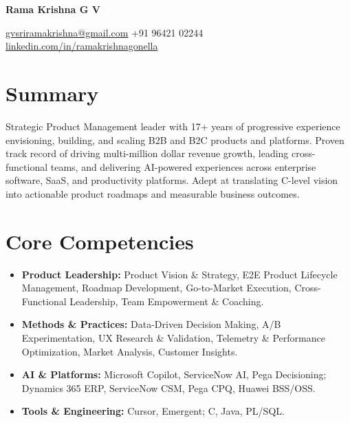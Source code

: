 \documentclass{article}
\newcommand{\resumename}[1]{%
    {\centering\fontsize{22}{26}\selectfont\bfseries #1\par}%
    \vspace{4pt}%
}
\newcommand{\resumecontact}[1]{%
    {\centering\normalsize\color{darkgray}#1\par}%
    \vspace{6pt}%
}
\begin{document}

\resumename{Rama Krishna G V}

\resumecontact{%
    \href{mailto:gvsriramakrishna@gmail.com}{gvsriramakrishna@gmail.com}
    \enspace\textbar\enspace
    +91 96421 02244
    \enspace\textbar\enspace
    \href{https://linkedin.com/in/ramakrishnagonella}{linkedin.com/in/ramakrishnagonella}
}


\section{Summary}

Strategic Product Management leader with 17+ years of progressive experience envisioning, building, and scaling B2B and B2C products and platforms. Proven track record of driving multi-million dollar revenue growth, leading cross-functional teams, and delivering AI-powered experiences across enterprise software, SaaS, and productivity platforms. Adept at translating C-level vision into actionable product roadmaps and measurable business outcomes.

\section{Core Competencies}

\begin{itemize}
    \item \textbf{Product Leadership:} Product Vision \& Strategy, E2E Product Lifecycle Management, Roadmap Development, Go-to-Market Execution, Cross-Functional Leadership, Team Empowerment \& Coaching.
    \item \textbf{Methods \& Practices:} Data-Driven Decision Making, A/B Experimentation, UX Research \& Validation, Telemetry \& Performance Optimization, Market Analysis, Customer Insights.
    \item \textbf{AI \& Platforms:} Microsoft Copilot, ServiceNow AI, Pega Decisioning; Dynamics 365 ERP, ServiceNow CSM, Pega CPQ, Huawei BSS/OSS.
    \item \textbf{Tools \& Engineering:} Cursor, Emergent; C, Java, PL/SQL.
\end{itemize}
\end{document}
